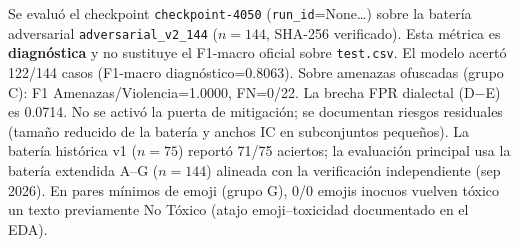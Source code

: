 Se evaluó el checkpoint \texttt{checkpoint-4050} (\texttt{run\_id}=None\ldots) sobre la batería adversarial \texttt{adversarial\_v2\_144} ($n=144$, SHA-256 verificado). Esta métrica es \textbf{diagnóstica} y no sustituye el F1-macro oficial sobre \texttt{test.csv}.
El modelo acertó 122/144 casos (F1-macro diagnóstico=0.8063). Sobre amenazas ofuscadas (grupo C): F1 Amenazas/Violencia=1.0000, FN=0/22. La brecha FPR dialectal (D$-$E) es 0.0714.
No se activó la puerta de mitigación; se documentan riesgos residuales (tamaño reducido de la batería y anchos IC en subconjuntos pequeños).
La batería histórica v1 ($n=75$) reportó 71/75 aciertos; la evaluación principal usa la batería extendida A--G ($n=144$) alineada con la verificación independiente (sep 2026).
En pares mínimos de emoji (grupo G), 0/0 emojis inocuos vuelven tóxico un texto previamente No Tóxico (atajo emoji--toxicidad documentado en el EDA).

